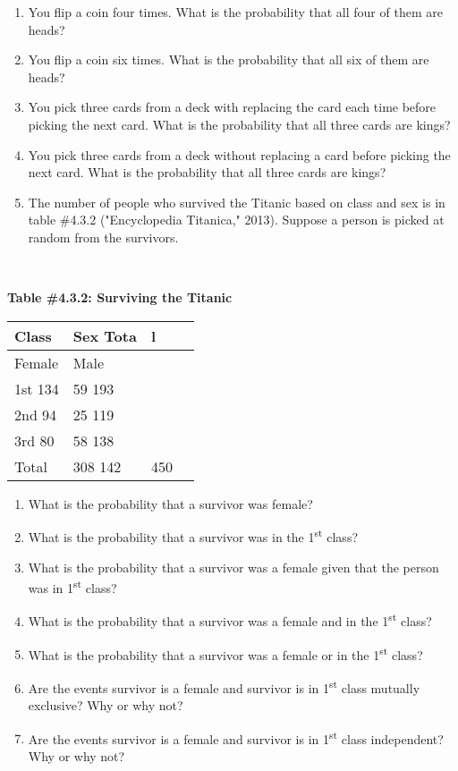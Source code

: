 \documentclass[]{book}
\begin{document}
\begin{enumerate}
\def\labelenumi{\arabic{enumi}.}
\setcounter{enumi}{6}
\item
  You flip a coin four times. What is the probability that all four of
  them are heads?
\item
  You flip a coin six times. What is the probability that all six of
  them are heads?
\item
  You pick three cards from a deck with replacing the card each time
  before picking the next card. What is the probability that all three
  cards are kings?
\item
  You pick three cards from a deck without replacing a card before
  picking the next card. What is the probability that all three cards
  are kings?
\item
  The number of people who survived the Titanic based on class and sex
  is in table \#4.3.2 ("Encyclopedia Titanica," 2013). Suppose a
  person is picked at random from the survivors.
\end{enumerate}

\textbf{\\
}

\textbf{Table \#4.3.2: Surviving the Titanic}

\begin{longtable}[]{@{}llll@{}}
\toprule
Class & Sex Tota & l &\tabularnewline
\midrule
\endhead
Female & Male & &\tabularnewline
1st 134 & 59 193 & &\tabularnewline
2nd 94 & 25 119 & &\tabularnewline
3rd 80 & 58 138 & &\tabularnewline
Total & 308 142 & 450 &\tabularnewline
\bottomrule
\end{longtable}

\begin{enumerate}
\def\labelenumi{\alph{enumi}.}
\item
  What is the probability that a survivor was female?
\item
  What is the probability that a survivor was in the 1\textsuperscript{st} class?
\item
  What is the probability that a survivor was a female given that the
  person was in 1\textsuperscript{st} class?
\item
  What is the probability that a survivor was a female and in the
  1\textsuperscript{st} class?
\item
  What is the probability that a survivor was a female or in the 1\textsuperscript{st}
  class?
\item
  Are the events survivor is a female and survivor is in 1\textsuperscript{st} class
  mutually exclusive? Why or why not?
\item
  Are the events survivor is a female and survivor is in 1\textsuperscript{st} class
  independent? Why or why not?
\end{enumerate}
\end{document}
